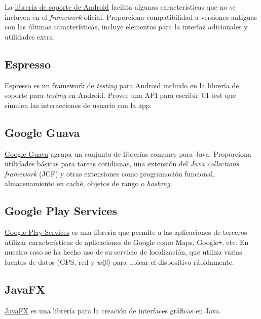 La
\href{https://developer.android.com/topic/libraries/support-library/}{librería
de soporte de Android} facilita algunas características que no se
incluyen en el \emph{framework} oficial. Proporciona compatibilidad a
versiones antiguas con las últimas características, incluye elementos
para la interfaz adicionales y utilidades extra.

\subsection{Espresso}\label{espresso}

\href{https://google.github.io/android-testing-support-library/docs/espresso/}{Espresso}
es un framework de \emph{testing} para Android incluido en la librería
de soporte para \emph{testing} en Android. Provee una API para escribir
UI test que simulen las interacciones de usuario con la app.

\subsection{Google Guava}\label{google-guava}

\href{https://github.com/google/guava}{Google Guava} agrupa un conjunto
de librerías comunes para Java. Proporciona utilidades básicas para
tareas cotidianas, una extensión del \emph{Java collections framework}
(JCF) y otras extensiones como programación funcional, almacenamiento en
caché, objetos de rango o \emph{hashing}.

\subsection{Google Play Services}\label{google-play-services}

\href{https://developers.google.com/android/guides/overview}{Google Play
Services} es una librería que permite a las aplicaciones de terceros
utilizar características de aplicaciones de Google como Maps, Google\texttt{+},
etc. En nuestro caso se ha hecho uso de su servicio de localización, que
utiliza varias fuentes de datos (GPS, red y \emph{wifi}) para ubicar el
dispositivo rápidamente.

\subsection{JavaFX}\label{javafx}

\href{http://docs.oracle.com/javase/8/javase-clienttechnologies.htm}{JavaFX}
es una librería para la creación de interfaces gráficas en Java.

